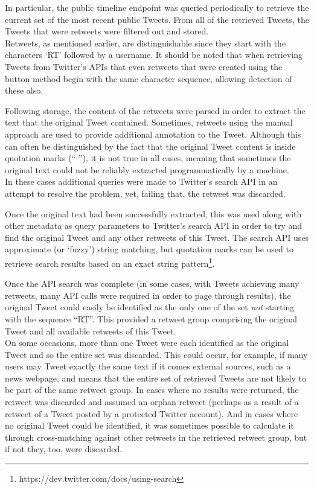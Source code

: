 In particular, the public timeline endpoint was queried periodically to retrieve the current set of the most recent public Tweets. From all of the retrieved Tweets, the Tweets that were retweets were filtered out and stored.\\
Retweets, as mentioned earlier, are distinguishable since they start with the characters `RT' followed by a username. It should be noted that when retrieving Tweets from Twitter's APIs that even retweets that were created using the button method begin with the same character sequence, allowing detection of these also.

Following storage, the content of the retweets were parsed in order to extract the text that the original Tweet contained. Sometimes, retweets using the manual approach are used to provide additional annotation to the Tweet. Although this can often be distinguished by the fact that the original Tweet content is inside quotation marks (`` ''), it is not true in all cases, meaning that sometimes the original text could not be reliably extracted programmatically by a machine.\\
In these cases additional queries were made to Twitter's search API in an attempt to resolve the problem, yet, failing that, the retweet was discarded.

Once the original text had been successfully extracted, this was used along with other metadata as query parameters to Twitter's search API in order to try and find the original Tweet and any other retweets of this Tweet. The search API uses approximate (or `fuzzy') string matching, but quotation marks can be used to retrieve search results based on an exact string pattern\footnote{https://dev.twitter.com/docs/using-search}.

Once the API search was complete (in some cases, with Tweets achieving many retweets, many API calls were required in order to page through results), the original Tweet could easily be identified as the only one of the set \textit{not} starting with the sequence ``RT''. This provided a retweet group comprising the original Tweet and all available retweets of this Tweet.\\
On some occasions, more than one Tweet were each identified as the original Tweet and so the entire set was discarded. This could occur, for example, if many users may Tweet exactly the same text if it comes external sources, such as a news webpage, and means that the entire set of retrieved Tweets are not likely to be part of the same retweet group.
In cases where no results were returned, the retweet was discarded and assumed an orphan retweet (perhaps as a result of a retweet of a Tweet posted by a protected Twitter account). And in cases where no original Tweet could be identified, it was sometimes possible to calculate it through cross-matching against other retweets in the retrieved retweet group, but if not they, too, were discarded.

